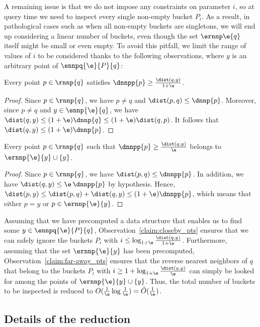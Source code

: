 A remaining issue is that we do not impose any constraints on
parameter $i$, so at query time we need to inspect every single
non-empty bucket $P_i$. As a result, in pathological cases such as
when all non-empty buckets are singletons, we will end up considering
a linear number of buckets, even though the set $\ernnp\e{q}$ itself
might be small or even empty. To avoid this pitfall, we limit the
range of values of $i$ to be considered thanks to the following
observations, where $y$ is an arbitrary point of $\ennpq{\e}{P}{q}$:
\begin{observation}\label{claim:closeby_pts}
  Every point $p\in\rnnp{q}$ satisfies $\dnnpp{p}\geq
  \frac{\dist(q,y)}{1+\e}$.
\end{observation}
\begin{proof}
   Since $p\in \rnnp{q}$, we have $p\neq q$ and $\dist(p,q)\leq
   \dnnp{p}$. Moreover, since $p\neq q$ and $y\in \ennp{\e}{q}$, we
   have $\dist(q,y)\leq (1+\e)\dnnp{q}\leq (1+\e)\dist(q,p)$. It
   follows that $\dist(q,y)\leq (1+\e)\dnnp{p}$.
 \end{proof}
\begin{observation}\label{claim:far-away_pts}
  Every point $p\in\rnnp{q}$ such that $\dnnpp{p}\geq
  \frac{\dist(q,y)}{\e}$ belongs to $\ernnp{\e}{y}\cup\{y\}$.
\end{observation}
\begin{proof}
   Since $p\in\rnnp{q}$, we have $\dist(p,q)\leq
   \dnnpp{p}$. In addition, we have $\dist(q,y)\leq \e\,\dnnpp{p}$ by
   hypothesis. Hence, $\dist(p,y)\leq \dist(p,q)+\dist(q,y)\leq
   (1+\e)\dnnpp{p}$, which means that either $p=y$ or $p\in \ernnp{\e}{y}$.
 \end{proof}
Assuming that we have precomputed a data structure that enables us to
find some $y\in\ennpq{\e}{P}{q}$, Observation~\ref{claim:closeby_pts}
ensures that we can safely ignore the buckets $P_i$ with
$i\leq\log_{1+\e} \frac{\dist(q,y)}{1+\e}$. Furthermore, assuming that
the set $\ernnp{\e}{y}$ has been precomputed,
Observation~\ref{claim:far-away_pts} ensures that the reverse
nearest neighbors of $q$ that belong to the buckets $P_i$ with
$i\geq 1+\log_{1+\e} \frac{\dist(q,y)}{\e}$ can simply be looked for
among the points of $\ernnp{\e}{y}\cup\{y\}$. Thus, the total number
of buckets to be inspected is reduced to 
$O(\frac{1}{\e}\log\frac{1}{\e})=\tilde O(\frac{1}{\e})$.


\subsection{Details of the reduction}
\label{sec:rnn_alg}


